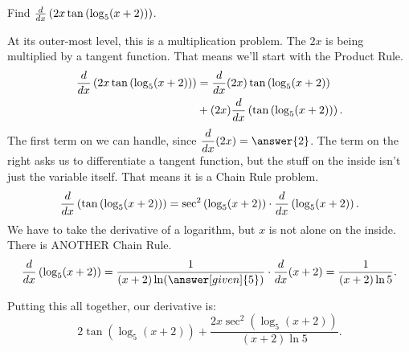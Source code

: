 \documentclass{ximera}
\begin{document}
\begin{example}
	Find $\frac{d}{\mathop{}\!d x} \left( 2x \tan \left(\log_5 (x+2)\right) \right)$.
	\begin{explanation}
		At its outer-most level, this is a multiplication problem.  The $2x$ is being multiplied by a tangent function.  That means we'll start with
		the Product Rule.
		\begin{align*} 
		\frac{d}{\mathop{}\!d x} \left( 2x \tan\left( \log_5 (x+2) \right) \right) &= \frac{d}{\mathop{}\!d x}(2x) \tan\left( \log_5 (x+2) \right) \\
			&+ (2x) \frac{d}{\mathop{}\!d x}\left( \tan\left( \log_5 (x+2)\right) \right).
		\end{align*}
		The first term on we can handle, since $\displaystyle \ddx(2x) = \answer{2}$.  The term on the right asks us to differentiate a tangent function, but the stuff
		on the inside isn't just the variable itself.  That means it is a Chain Rule problem.
			\[ \frac{d}{\mathop{}\!d x} \left( \tan \left( \log_5 (x+2) \right) \right) = \sec^2\left( \log_5 (x+2) \right) \cdot \frac{d}{\mathop{}\!d x} \left( \log_5 (x+2) \right). \]
		We have to take the derivative of a logarithm, but $x$ is not alone on the inside.  There is ANOTHER Chain Rule.
			\[ \ddx \left( \log_5 (x+2) \right) = \dfrac{1}{(x+2) \ln( \answer[given]{5} )} \cdot \ddx(x+2) = \dfrac{1}{(x+2) \ln 5}. \]

		Putting this all together, our derivative is:
		\[ 2 \tan \left( \log_5 (x+2) \right) + \dfrac{2x \sec^2 \left( \log_5 (x+2) \right)}{(x+2) \ln 5}. \]
	\end{explanation}
\end{example}
\end{document}
